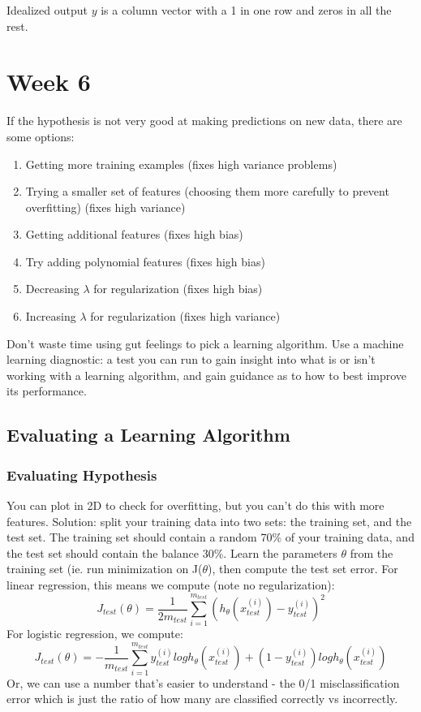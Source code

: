\documentclass[11pt,letterpaper]{article}
\begin{document}
Idealized output $y$ is a column vector with a 1 in one row and zeros in all the rest.

\section{Week 6}
If the hypothesis is not very good at making predictions on new data, there are some options:
\begin{enumerate}
	\item Getting more training examples (fixes high variance problems)
	\item Trying a smaller set of features (choosing them more carefully to prevent overfitting) (fixes high variance)
	\item Getting additional features (fixes high bias)
	\item Try adding polynomial features (fixes high bias)
	\item Decreasing $\lambda$ for regularization (fixes high bias)
	\item Increasing $\lambda$ for regularization (fixes high variance)
\end{enumerate}

Don't waste time using gut feelings to pick a learning algorithm. Use a machine learning diagnostic: a test you can run to gain insight into what is or isn't working with a learning algorithm, and gain guidance as to how to best improve its performance.
\subsection{Evaluating a Learning Algorithm}
\subsubsection{Evaluating Hypothesis}
You can plot in 2D to check for overfitting, but you can't do this with more features. Solution: split your training data into two sets: the training set, and the test set. The training set should contain a random 70\% of your training data, and the test set should contain the balance 30\%. Learn the parameters $\theta$ from the training set (ie. run minimization on J($\theta$), then compute the test set error.
For linear regression, this means we compute (note no regularization):
$$ J_{test}(\theta) = \frac{1}{2m_{test}} \sum_{i=1}^{m_{test}}(h_\theta(x_{test}^{(i)}) - y_{test}^{(i)})^2 $$
For logistic regression, we compute: 
$$ J_{test}(\theta) = -\frac{1}{m_{test}} \sum_{i=1}^{m_{test}}y_{test}^{(i)}log h_\theta(x_{test}^{(i)}) + (1-y_{test}^{(i)})log h_\theta (x_{test}^{(i)}) $$
Or, we can use a number that's easier to understand - the 0/1 misclassification error which is just the ratio of how many are classified correctly vs incorrectly.
\end{document}
